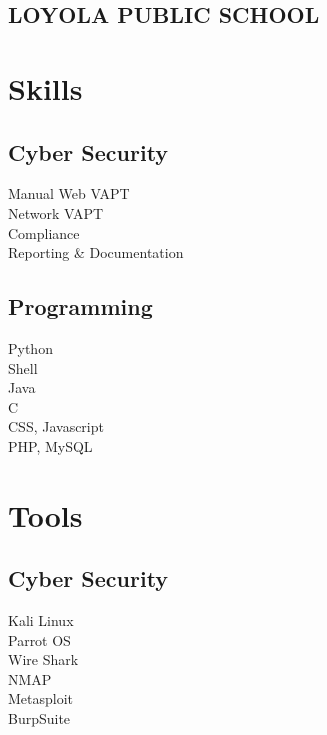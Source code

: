 \documentclass[]{roshan_resume}
\begin{document}
\begin{minipage}[t]{0.33\textwidth}
		\subsection{LOYOLA PUBLIC SCHOOL}
		
		
		
		
		\section{Skills}
		\subsection{Cyber Security}
		\textbullet{} Manual Web VAPT \\ 
		\textbullet{} Network VAPT \\
		\textbullet{} Compliance \\
		\textbullet{} Reporting \& Documentation
		\newline
		\subsection{Programming}
		\textbullet{} Python\\
		\textbullet{} Shell\\ 
		\textbullet{} Java \\
		\textbullet{} C  \\ 
		\textbullet{} CSS, Javascript \\
		\textbullet{} PHP, MySQL\\
		\sectionsep
		
		\section{Tools}
		\subsection{Cyber Security}
		\textbullet{} Kali Linux \\
		\textbullet{} Parrot OS \\
		\textbullet{} Wire Shark \\
		\textbullet{} NMAP \\
		\textbullet{} Metasploit \\
		\textbullet{} BurpSuite
		
		
	\end{minipage} 
\end{document}

